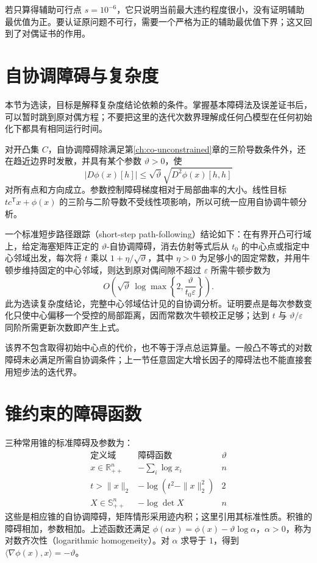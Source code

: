 若只算得辅助可行点 $s=10^{-6}$，它只说明当前最大违约程度很小，没有证明辅助最优值为正。要认证原问题不可行，需要一个严格为正的辅助最优值下界；这又回到了对偶证书的作用。

\section{自协调障碍与复杂度}

本节为选读，目标是解释复杂度结论依赖的条件。掌握基本障碍法及误差证书后，可以暂时跳到原对偶方程；不要把这里的迭代次数界理解成任何凸模型在任何初始化下都具有相同运行时间。

对开凸集 $C$，自协调障碍除满足第\ref{ch:co-unconstrained}章的三阶导数条件外，还在趋近边界时发散，并具有某个参数 $\vartheta>0$，使
\[
 |D\phi(x)[h]|\leq\sqrt{\vartheta}\sqrt{D^2\phi(x)[h,h]}
\]
对所有点和方向成立。参数控制障碍梯度相对于局部曲率的大小。线性目标 $t c^{\mathsf T}x+\phi(x)$ 的三阶与二阶导数不受线性项影响，所以可统一应用自协调牛顿分析。

一个标准短步路径跟踪（short-step path-following）结论如下：在有界开凸可行域上，给定海塞矩阵正定的 $\vartheta$-自协调障碍，消去仿射等式后从 $t_0$ 的中心点或指定中心邻域出发，每次将 $t$ 乘以 $1+\eta/\sqrt\vartheta$，其中 $\eta>0$ 为足够小的固定常数，并用牛顿步维持固定的中心邻域，则达到原对偶间隙不超过 $\varepsilon$ 所需牛顿步数为
\[
 O\!\left(\sqrt\vartheta\,
 \log\max\left\{2,\frac{\vartheta}{t_0\varepsilon}\right\}\right).
\]
此为选读复杂度结论，完整中心邻域估计见\cite{boyd-vandenberghe}的自协调分析。证明要点是每次参数变化只使中心偏移一个受控的局部距离，因而常数次牛顿校正足够；达到 $t$ 与 $\vartheta/\varepsilon$ 同阶所需更新次数即产生上式。

该界不包含取得初始中心点的代价，也不等于浮点总运算量。一般凸不等式的对数障碍未必满足所需自协调条件；上一节任意固定大增长因子的障碍法也不能直接套用短步法的迭代界。

\section{锥约束的障碍函数}

三种常用锥的标准障碍及参数为：
\[
 \begin{array}{c|c|c}
 \text{定义域}&\text{障碍函数}&\vartheta\\\hline
 x\in\mathbb R_{++}^n&-\sum_i\log x_i&n\\
 t>\|x\|_2&-\log(t^2-\|x\|_2^2)&2\\
 X\in\mathbb S_{++}^n&-\log\det X&n
 \end{array}
\]
这些是相应锥的自协调障碍，矩阵情形采用迹内积；这里引用其标准性质。积锥的障碍相加，参数相加。上述函数还满足 $\phi(\alpha x)=\phi(x)-\vartheta\log\alpha$，$\alpha>0$，称为对数齐次性（logarithmic homogeneity）。对 $\alpha$ 求导于 $1$，得到 $\langle\nabla\phi(x),x\rangle=-\vartheta$。

